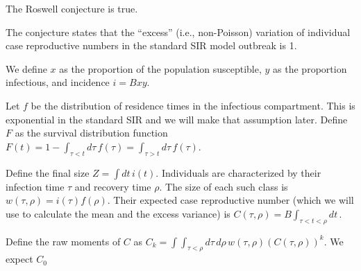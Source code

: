 \documentclass[12pt]{article}
\newcommand{\dt}{dt\,}
\newcommand{\dtau}{d\tau\,}
\newcommand{\drho}{d\rho\,}
\begin{document}
The Roswell conjecture is true.

The conjecture states that the “excess” (i.e., non-Poisson) variation of individual case reproductive numbers in the standard SIR model outbreak is 1.

We define $x$ as the proportion of the population susceptible, $y$ as the proportion infectious, and incidence $i = Bxy$.

Let $f$ be the distribution of residence times in the infectious compartment. This is exponential in the standard SIR and we will make that assumption later. Define $F$ as the survival distribution function 
$F(t) 
	= 1 -\int_{\tau<t} \dtau f(\tau)
	= \int_{\tau>t} \dtau f(\tau)
$.

Define the final size $Z = \int\dt i(t)$. Individuals are characterized by their infection time $\tau$ and recovery time $\rho$. The size of each such class is $w(\tau, \rho) = i(\tau) f(\rho)$. Their expected case reproductive number (which we will use to calculate the mean and the excess variance) is $C(\tau, \rho) = B \int_{\tau<t<\rho} \dt$.

Define the raw moments of $C$ as $C_k = \int\int_{\tau<\rho} \dtau\drho w(\tau, \rho) (C(\tau, \rho))^k$. We expect $C_0$ 
\end{document}
